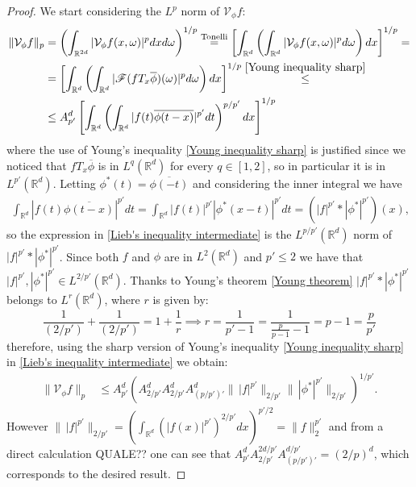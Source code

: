 \documentclass[corpo=11pt, stile=classica, tipotesi=custom,
greek, evenboxes, english]{toptesi}
\numberwithin{equation}{chapter}
\newcommand{\R}{\mathbb{R}} %
\newcommand{\V}{\mathcal{V}} %
\newcommand{\F}{\mathscr{F}} %
\begin{document}
\begin{proof}
	We start considering the $L^p$ norm of $\V_{\phi} f$:
	\begin{align}
		\|\V_{\phi} f\|_p &= \left(\int_{\R^{2d}} |\V_{\phi}f(x,\omega)|^p dxd\omega\right)^{1/p} \overset{\mathrm{Tonelli}}{=} \left[\int_{\R^d} \left(\int_{\R^d} |\V_{\phi} f (x,\omega)|^p d\omega\right)dx\right]^{1/p} =\nonumber \\
						  &= \left[\int_{\R^d} \left(\int_{\R^d} |\F(f T_x \overline{\phi})(\omega)|^p d\omega\right)dx\right]^{1/p} \overset{\eqref{Young inequality sharp}}{\leq} \nonumber\\
						  &\leq A_{p'}^d\left[\int_{\R^d} \left(\int_{\R^d} |f(t) \overline{\phi(t-x)}|^{p'}dt\right)^{p/p'}dx\right]^{1/p} \label{Lieb's inequality intermediate}
	\end{align}
	where the use of Young's inequality \eqref{Young inequality sharp} is justified since we noticed that $fT_x \overline{\phi}$ is in $L^q(\R^d)$ for every $q \in [1,2]$, so in particular it is in $L^{p'}(\R^d)$. Letting $\phi^*(t) = \overline{\phi(-t)}$ and considering the inner integral we have
	\begin{align*}
		\int_{\R^d} |f(t) \overline{\phi(t-x)}|^{p'}dt = \int_{\R^d} |f(t)|^{p'} |\phi^*(x-t)|^{p'}dt = \left(|f|^{p'} * |\phi^*|^{p'}\right)(x),
	\end{align*}
	so the expression in \eqref{Lieb's inequality intermediate} is the $L^{p/p'}(\R^d)$ norm of $|f|^{p'} * |\phi^*|^{p'}$. Since both $f$ and $\phi$ are in $L^2(\R^d)$ and $p' \leq 2$ we have that $|f|^{p'},|\phi^*|^{p'} \in L^{2/p'}(\R^d)$. Thanks to Young's theorem \ref{Young theorem} $|f|^{p'} * |\phi^*|^{p'}$ belongs to $L^r(\R^d)$, where $r$ is given by:
	\begin{equation*}
		\dfrac{1}{(2/p')} + \dfrac{1}{(2/p')} = 1 + \dfrac{1}{r} \implies r = \dfrac{1}{p'-1} = \dfrac{1}{\frac{p}{p-1}-1} = p-1 = \dfrac{p}{p'}
	\end{equation*}
	therefore, using the sharp version of Young's inequality \eqref{Young inequality sharp} in \eqref{Lieb's inequality intermediate} we obtain:
	\begin{align*}
		\|\V_{\phi} f\|_p &\leq A_{p'}^d \left(A_{2/p'}^d A_{2/p'}^d A_{(p/p')'}^d \| \,|f|^{p'} \|_{2/p'} \|\,|\phi^*|^{p'}\|_{2/p'} \right)^{1/p'}.
	\end{align*}
	However $\| \,|f|^{p'} \|_{2/p'} = (\int_{\R^d} (|f(x)|^{p'})^{2/p'}dx)^{p'/2} = \|f\|_2^{p'}$ and from a direct calculation {\color{blue} QUALE??} one can see that $A_{p'}^d A_{2/p'}^{2d/p'}A_{(p/p')'}^{d/p'}=(2/p)^d$, which corresponds to the desired result.
\end{proof}
\end{document}
